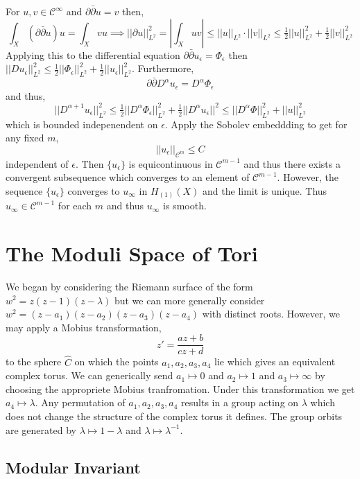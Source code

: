 \documentclass[12pt]{extarticle}
\theoremstyle{definition}
\begin{document}
For $u, v \in \mathcal{C}^{\infty}$ and $\partial \bar{\partial} u = v$ then,
\[ \int_X (\partial \bar{\partial} u) u = \int_X vu \implies ||\partial u ||_{L^2}^2 = \left| \int_X uv \right| \le ||u||_{L^2} \cdot ||v||_{L^2} \le \tfrac{1}{2} ||u||_{L^2}^2 + \tfrac{1}{2} ||v||_{L^2}^2 \]
Applying this to the differential equation $\partial \bar{\partial} u_{\epsilon} = \Phi_{\epsilon}$ then $|| D u_{\epsilon} ||_{L^2}^2 \le \tfrac{1}{2} || \Phi_{\epsilon} ||_{L^2}^2 + \tfrac{1}{2} || u_{\epsilon} ||_{L^2}^2$. Furthermore,
\[ \partial \bar{\partial} D^{\alpha} u_{\epsilon} = D^{\alpha} \Phi_{\epsilon} \]
and thus,
\[ ||D^{\alpha + 1} u_{\epsilon}||_{L^2}^2 \le \tfrac{1}{2} ||D^{\alpha} \Phi_{\epsilon}||_{L^2}^2 + \tfrac{1}{2} ||D^{\alpha} u_{\epsilon} ||^2 \le ||D^\alpha \Phi||_{L^2}^2 + ||u||_{L^2}^2 \]
which is bounded indepenendent on $\epsilon$. Apply the Sobolev embeddding to get for any fixed $m$,
\[ ||u_{\epsilon}||_{\mathcal{C}^m} \le C \]
independent of $\epsilon$. Then $\{ u_{\epsilon} \}$ is equicontinuous in $\mathcal{C}^{m-1}$ and thus there exists a convergent subsequence which converges to an element of $\mathcal{C}^{m-1}$. However, the sequence $\{ u_{\epsilon} \}$ converges to $u_{\infty}$ in $H_{(1)}(X)$ and the limit is unique. Thus $u_{\infty} \in \mathcal{C}^{m-1}$ for each $m$ and thus $u_{\infty}$ is smooth. 


\section{The Moduli Space of Tori}

We began by considering the Riemann surface of the form $w^2 = z(z - 1)(z - \lambda)$ but we can more generally consider $w^2 = (z - a_1)(z - a_2)(z - a_3)(z - a_4)$ with distinct roots. However, we may apply a Mobius transformation,
\[ z' = \frac{a z + b}{cz + d} \]
to the sphere $\hat{C}$ on which the points $a_1, a_2, a_3, a_4$ lie which gives an equivalent complex torus. We can generically send $a_1 \mapsto 0$ and $a_2 \mapsto 1$ and $a_3 \mapsto \infty$ by choosing the appropriete Mobius tranfromation. Under this transformation we get $a_4 \mapsto \lambda$. Any permutation of $a_1, a_2, a_3, a_4$ results in a group acting on $\lambda$ which does not change the structure of the complex torus it defines. The group orbits are generated by $\lambda \mapsto 1 - \lambda$ and $\lambda \mapsto \lambda^{-1}$. 

\subsection{Modular Invariant}
\end{document}
